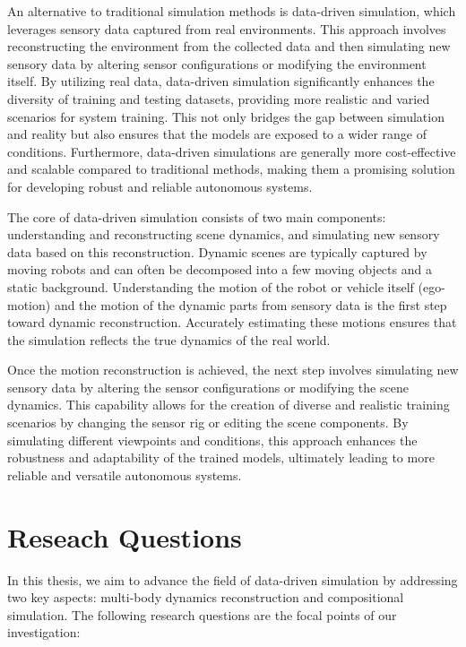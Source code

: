 An alternative to traditional simulation methods is data-driven simulation, which leverages sensory data captured from real environments. This approach involves reconstructing the environment from the collected data and then simulating new sensory data by altering sensor configurations or modifying the environment itself. By utilizing real data, data-driven simulation significantly enhances the diversity of training and testing datasets, providing more realistic and varied scenarios for system training. This not only bridges the gap between simulation and reality but also ensures that the models are exposed to a wider range of conditions. Furthermore, data-driven simulations are generally more cost-effective and scalable compared to traditional methods, making them a promising solution for developing robust and reliable autonomous systems.

The core of data-driven simulation consists of two main components: understanding and reconstructing scene dynamics, and simulating new sensory data based on this reconstruction. Dynamic scenes are typically captured by moving robots and can often be decomposed into a few moving objects and a static background. Understanding the motion of the robot or vehicle itself (ego-motion) and the motion of the dynamic parts from sensory data is the first step toward dynamic reconstruction. Accurately estimating these motions ensures that the simulation reflects the true dynamics of the real world.

Once the motion reconstruction is achieved, the next step involves simulating new sensory data by altering the sensor configurations or modifying the scene dynamics. This capability allows for the creation of diverse and realistic training scenarios by changing the sensor rig or editing the scene components. By simulating different viewpoints and conditions, this approach enhances the robustness and adaptability of the trained models, ultimately leading to more reliable and versatile autonomous systems.

\section{Reseach Questions}
In this thesis, we aim to advance the field of data-driven simulation by addressing two key aspects: multi-body dynamics reconstruction and compositional simulation. The following research questions are the focal points of our investigation:

